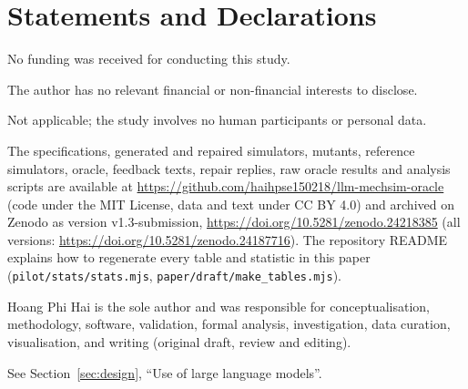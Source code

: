 \section*{Statements and Declarations}

 No funding was received for conducting this study.

 The author has no relevant financial or non-financial interests to disclose.

 Not applicable; the study involves no human participants or personal data.

 The specifications, generated and repaired simulators, mutants, reference simulators, oracle, feedback texts, repair replies, raw oracle results and analysis scripts are available at \url{https://github.com/haihpse150218/llm-mechsim-oracle} (code under the MIT License, data and text under CC BY 4.0) and archived on Zenodo as version v1.3-submission, \url{https://doi.org/10.5281/zenodo.24218385} (all versions: \url{https://doi.org/10.5281/zenodo.24187716}). The repository README explains how to regenerate every table and statistic in this paper (\texttt{pilot/stats/stats.mjs}, \texttt{paper/draft/make\_tables.mjs}).

 Hoang Phi Hai is the sole author and was responsible for conceptualisation, methodology, software, validation, formal analysis, investigation, data curation, visualisation, and writing (original draft, review and editing).

 See Section~\ref{sec:design}, ``Use of large language models''.
